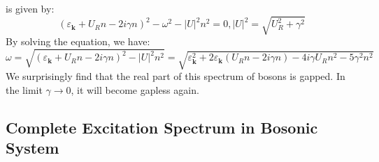 \documentclass[aps,onecolumn,superscriptaddress,notitlepage,longbibliography]{revtex4-1}
\begin{document}
is given by:
\begin{equation}
  (\varepsilon_{\mathbf{k}} + U_R n - 2 i \gamma n)^2 - \omega^2 - | U |^2
  n^2 = 0, | U |^2 = \sqrt{U_R^2 + \gamma^2}
\end{equation}
By solving the equation, we have:
\begin{equation}
  \omega = \sqrt{(\varepsilon_{\mathbf{k}} + U_R n - 2 i \gamma n)^2 - | U
  |^2 n^2} = \sqrt{\varepsilon_{\mathbf{k}}^2 + 2 \varepsilon_{\mathbf{k}}
  (U_R n - 2 i \gamma n) - 4 i \gamma U_R n^2 - 5 \gamma^2 n^2} \label{ES}
\end{equation}
We surprisingly find that the real part of this spectrum of bosons is gapped.
In the limit $\gamma \rightarrow 0$, it will become gapless again.

\subsection{Complete Excitation Spectrum in Bosonic System}
\end{document}
